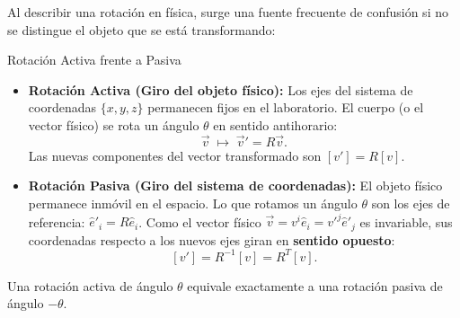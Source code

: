 \documentclass[11pt,letterpaper]{article}
\begin{document}
Al describir una rotación en física, surge una fuente frecuente de confusión si no se distingue el objeto que se está transformando:

\begin{theorembox}{Rotación Activa frente a Pasiva}
\begin{itemize}
    \item \textbf{Rotación Activa (Giro del objeto físico):}
    Los ejes del sistema de coordenadas $\{x, y, z\}$ permanecen fijos en el laboratorio. El cuerpo (o el vector físico) se rota un ángulo $\theta$ en sentido antihorario:
    \[
    \vec{v} \;\longmapsto\; \vec{v}' = R\vec{v}.
    \]
    Las nuevas componentes del vector transformado son $[v'] = R [v]$.
    \item \textbf{Rotación Pasiva (Giro del sistema de coordenadas):}
    El objeto físico permanece inmóvil en el espacio. Lo que rotamos un ángulo $\theta$ son los ejes de referencia: $\hat{e}'_i = R\hat{e}_i$.
    Como el vector físico $\vec{v} = v^i \hat{e}_i = v'^j \hat{e}'_j$ es invariable, sus coordenadas respecto a los nuevos ejes giran en \textbf{sentido opuesto}:
    \[
    [v'] = R^{-1}[v] = R^T [v].
    \]
\end{itemize}
Una rotación activa de ángulo $\theta$ equivale exactamente a una rotación pasiva de ángulo $-\theta$.
\end{theorembox}
\end{document}
